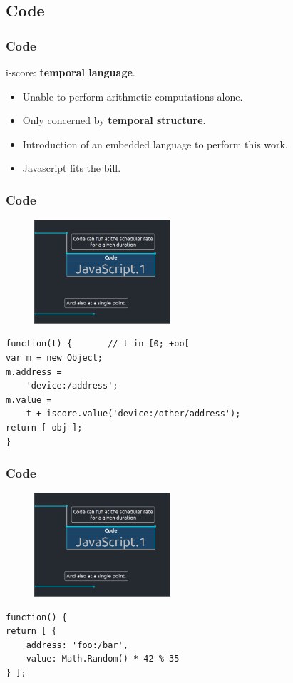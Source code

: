 \documentclass{beamer}
\begin{document}
\subsection{Code}
\begin{frame}
    \frametitle{Code}
    \Large
    i-score: \textbf{temporal language}. 
    \begin{itemize}
    \item Unable to perform arithmetic computations alone. 
    \item Only concerned by \textbf{temporal structure}.
    \item Introduction of an embedded language to perform this work.
    \item Javascript fits the bill.
    \end{itemize}
    
    \Large
\end{frame}

\begin{frame}[fragile]
    \frametitle{Code}
    
    \begin{figure}
        \includegraphics[width=0.45\textwidth]{images/script.png}
    \end{figure}
    
    \begin{lstlisting}
function(t) {       // t in [0; +oo[
var m = new Object; 
m.address = 
    'device:/address'; 
m.value = 
    t + iscore.value('device:/other/address'); 
return [ obj ]; 
}
    \end{lstlisting}
\end{frame}
\begin{frame}[fragile]
    \frametitle{Code}
    
    \begin{figure}
        \includegraphics[width=0.45\textwidth]{images/script.png}
    \end{figure}
    
    \begin{lstlisting}
function() {
return [ { 
    address: 'foo:/bar',
    value: Math.Random() * 42 % 35
} ];
\end{lstlisting}
\end{frame}
\end{document}
